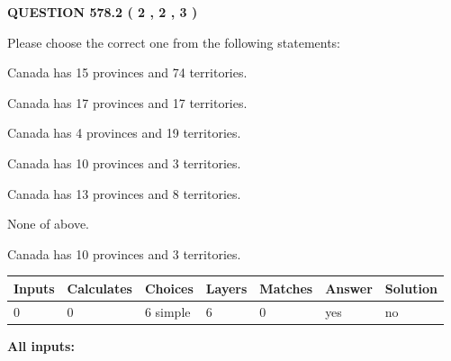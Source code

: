 \documentclass[12pt]{article}
\begin{document}
   
  
\vspace{0.2in}
  
{\textbf{\Large{QUESTION
578.2 
 ( 2 , 2 , 3 )
}}}
  
  
Please choose the correct one from the following statements:
 
 
Canada has  15 provinces and  74 territories.
 
 
Canada has  17 provinces and  17 territories.
 
 
Canada has   4 provinces and  19 territories.
 
 
Canada has 10  provinces and 3 territories.
 
 
Canada has  13 provinces and  8 territories.
 
 
 None of above.
 
 
\noindent{}
 
 
Canada has 10  provinces and 3 territories.
 
 
\noindent{}
 
 
   
   
   
   
\noindent\begin{tabular}{|l|l|l|l|l|l|l|}
 \hline
Inputs & Calculates & Choices & Layers & Matches & Answer & Solution \\ \hline
 0  & 
 0  & 
 6
  simple  
  & 
 6  & 
 0  & 
  yes & 
  no 
  \\ \hline
 \end{tabular}
   
   
   
   
\noindent{}
   
   
   
   
\noindent\vspace{0.1in}\hspace{-0.08in} {\textbf{\Large{All inputs: }}}
   
   
   
   
   
   
 \vspace{0.2in}
 
\end{document}
